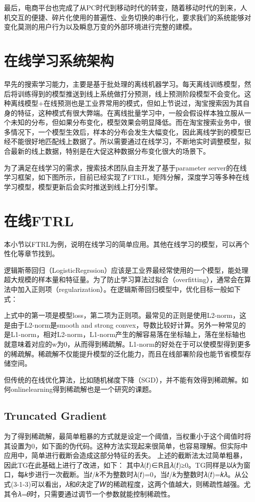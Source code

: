 最后，电商平台也完成了从PC时代到移动时代的转变，随着移动时代的到来，人机交互的便捷、碎片化使用的普遍性、业务切换的串行化，要求我们的系统能够对变化莫测的用户行为以及瞬息万变的外部环境进行完整的建模。

\section{在线学习系统架构}
早先的搜索学习能力，主要是基于批处理的离线机器学习。每天离线训练模型，然后将训练得到的模型推送到线上系统做打分预测，线上预测阶段模型不会变化。这种离线模型+在线预测也是工业界常用的模式，但如上节说过，淘宝搜索因为其自身的特征，这种模式有很大弊端。在离线批量学习中，一般会假设样本独立服从一个未知的分布，但如果分布变化，模型效果会明显降低。而在淘宝搜索业务中，很多情况下，一个模型生效后，样本的分布会发生大幅变化，因此离线学到的模型已经不能很好地匹配线上数据了。所以需要通过在线学习，不断地实时调整模型，拟合最新的线上数据，特别是在大促这种数据分布变化很大的场景下。

为了满足在线学习的需求，搜索技术团队自主开发了基于parameter server的在线学习框架，如下图所示，目前已经实现了FTRL，矩阵分解，深度学习等多种在线学习模型，模型更新后会实时推送到线上打分引擎。

	
\section{在线FTRL}
本小节以FTRL为例，说明在线学习的简单应用。其他在线学习的模型，可以再个性化等章节找到。

逻辑斯蒂回归（LogisticRegrssion）应该是工业界最经常使用的一个模型，能处理超大规模的样本量和特征量。为了防止学习算法过拟合（overfitting），通常会在算法中加入正则项（regularization）。在逻辑斯蒂回归模型中，优化目标一般如下式：

上式中的第一项是模型loss，第二项为正则项。最常见的正则是使用L2-norm，这是由于L2-norm是smooth and strong convex，导数比较好计算。另外一种常见的是L1-norm，相对L2-norm，L1-norm产生的解容易落在坐标轴上，落在坐标轴也就意味着对应的w为0，从而得到稀疏解。L1-norm的好处在于可以使模型得到更多的稀疏解。稀疏解不仅能提升模型的泛化能力，而且在线部署阶段也能节省模型存储空间。

但传统的在线优化算法，比如随机梯度下降（SGD），并不能有效得到稀疏解。如何onlinelearning得到稀疏解也是一个研究的课题。

\subsection{Truncated Gradient}
为了得到稀疏解，最简单粗暴的方式就是设定一个阈值，当权重小于这个阈值时将其设置为0，如下面的伪代码。这种方法实现起来很简单，也容易理解。但实际中应用中，简单进行截断会造成这部分特征的丢失。
上述的截断法太过简单粗暴，因此TG在此基础上进行了改进，如下：
其中𝜆(𝑡)∈ℝ且𝜆(𝑡)≥0。TG同样是以𝑘为窗口，每𝑘步进行一次截断。当𝑡/𝑘不为整数时𝜆(𝑡)=0，当𝑡/𝑘为整数时𝜆(𝑡)=𝑘𝜆。从公式(3-1-3)可以看出，𝜆和𝜃决定了𝑊的稀疏程度，这两个值越大，则稀疏性越强。尤其令𝜆=𝜃时，只需要通过调节一个参数就能控制稀疏性。

